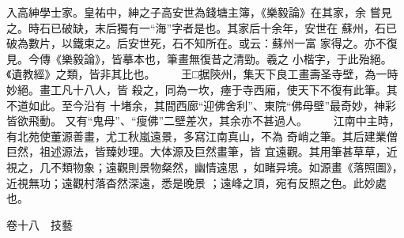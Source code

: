 \documentclass{ctexart}
\begin{document}
入高紳學士家。皇祐中，紳之子高安世為錢塘主簿，《樂毅論》在其家，余 嘗見之。時石已破缺，末后獨有一``海''字者是也。其家后十余年，安世在 蘇州，石已破為數片，以鐵束之。后安世死，石不知所在。或云：蘇州一富 家得之。亦不復見。今傳《樂毅論》，皆摹本也，筆畫無復昔之清勁。羲之 小楷字，于此殆絕。《遺教經》之類，皆非其比也。 　　王□据陝州，集天下良工畫壽圣寺壁，為一時妙絕。畫工凡十八人，皆 殺之，同為一坎，瘞于寺西廂，使天下不復有此筆。其不道如此。至今沿有 十堵余，其間西廊``迎佛舍利''、東院``佛母壁''最奇妙，神彩皆欲飛動。 又有``鬼母''、``瘦佛''二壁差次，其余亦不甚過人。 　　江南中主時，有北苑使董源善畫，尤工秋嵐遠景，多寫江南真山，不為 奇峭之筆。其后建業僧巨然，祖述源法，皆臻妙理。大体源及巨然畫筆，皆 宜遠觀。其用筆甚草草，近視之，几不類物象；遠觀則景物粲然，幽情遠思 ，如睹异境。如源畫《落照圖》，近視無功；遠觀村落杳然深遠，悉是晚景 ；遠峰之頂，宛有反照之色。此妙處也。

卷十八　技藝
\end{document}
